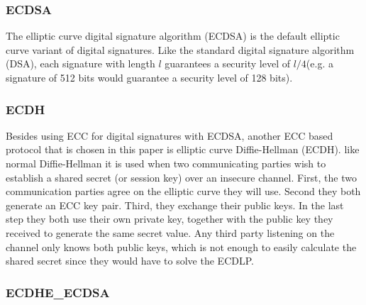 \subsubsection{ECDSA} 
\label{subsubsec:ecdsa}

The elliptic curve digital signature algorithm (ECDSA) is the default elliptic curve variant of digital signatures. Like the standard digital signature algorithm (DSA), each signature with length $l$ guarantees a security level of $l/4$(e.g. a signature of 512 bits would guarantee a security level of 128 bits).

\subsubsection{ECDH} 
\label{subsubsec:ecdh}

Besides using ECC for digital signatures with ECDSA, another ECC based protocol that is chosen in this paper is elliptic curve Diffie-Hellman (ECDH). like normal Diffie-Hellman it is used when two communicating parties wish to establish a shared secret (or session key) over an insecure channel. First, the two communication parties agree on the elliptic curve they will use. Second they both generate an ECC key pair. Third, they exchange their public keys. In the last step they both use their own private key, together with the public key they received to generate the same secret value. Any third party listening on the channel only knows both public keys, which is not enough to easily calculate the shared secret since they would have to solve the ECDLP.

\subsubsection{ECDHE\_ECDSA} 
\label{subsubsec:ecdh_ecdsa}

